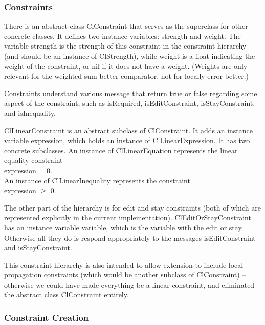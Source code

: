 \documentclass{article}
\begin{document}
\subsubsection{Constraints}
\label{constraint-classes}

There is an abstract class {\sf ClConstraint} that serves as the superclass
for other concrete classes.  It defines two instance variables: {\sf
strength} and {\sf weight}.  The variable {\sf strength} is the strength of
this constraint in the constraint hierarchy (and should be an instance of
{\sf ClStrength}), while {\sf weight} is a float indicating the weight of
the constraint, or nil if it does not have a weight.  (Weights are only
relevant for the weighted-sum-better comparator, not for
locally-error-better.) 

Constraints understand various message that return true or false regarding
some aspect of the constraint, such as {\sf isRequired}, {\sf
isEditConstraint}, {\sf isStayConstraint}, and {\sf isInequality}.

{\sf ClLinearConstraint} is an abstract subclass of {\sf ClConstraint}.  It
adds an instance variable {\sf expression}, which holds an instance of
{\sf ClLinearExpression}.  It has two concrete subclasses.  An instance of
{\sf ClLinearEquation} represents the linear equality constraint  \\
\hspace*{1cm} {\sf expression = 0}. \\
An instance of {\sf  ClLinearInequality} represents
the constraint \\
\hspace*{1cm} {\sf expression} $\geq$ 0.

The other part of the hierarchy is for edit and stay constraints (both of
which are represented explicitly in the current implementation).  {\sf
ClEditOrStayConstraint} has an instance variable {\sf variable}, which is
the variable with the edit or stay.  Otherwise all they do is respond
appropriately to the messages {\sf isEditConstraint} and {\sf
isStayConstraint}. 

This constraint hierarchy is also intended to allow extension to include
local propagation constraints (which would be another subclass of {\sf
  ClConstraint}) -- otherwise we could have made everything be a linear
constraint, and eliminated the abstract class {\sf ClConstraint}
entirely.

\subsubsection{Constraint Creation}
\label{constraint-creation}
\end{document}
